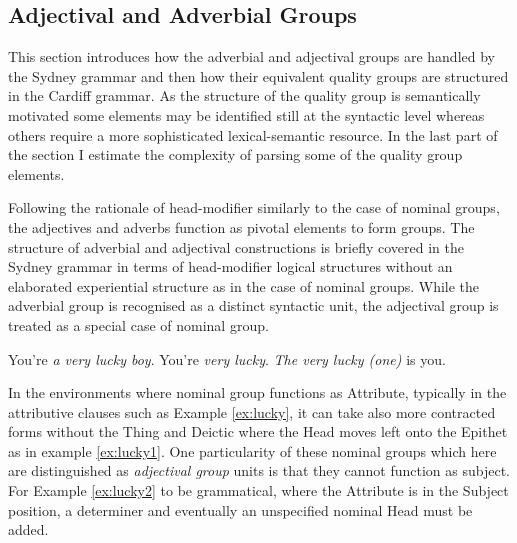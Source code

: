\subsection{Adjectival and Adverbial Groups}
	\label{sec:advectival-adverbial-groups}

    This section introduces how the adverbial and adjectival groups are handled by the Sydney grammar and then how their equivalent quality groups are structured in the Cardiff grammar. As the structure of the quality group is semantically motivated some elements may be identified still at the syntactic level whereas others require a more sophisticated lexical-semantic resource. In the last part of the section I estimate the complexity of parsing some of the quality group elements.

	Following the rationale of head-modifier similarly to the case of nominal groups, the adjectives and adverbs function as pivotal elements to form groups. The structure of adverbial and adjectival constructions is briefly covered in the Sydney grammar in terms of head-modifier logical structures without an elaborated experiential structure as in the case of nominal groups. While the adverbial group is recognised as a distinct syntactic unit, the adjectival group is treated as a special case of nominal group. %
	
	\begin{exe}
		\ex\label{ex:lucky} You're \textit{a very lucky boy}.
        \ex\label{ex:lucky1} You're \textit{very lucky}.
        \ex\label{ex:lucky2} \textit{The very lucky (one)} is you.
	\end{exe}
	
        

    In the environments where nominal group functions as Attribute, typically in the attributive clauses such as Example \ref{ex:lucky}, it can take also more contracted forms without the Thing and Deictic where the Head moves left onto the Epithet as in example \ref{ex:lucky1}. One particularity of these nominal groups which here are distinguished as \textit{adjectival group} units is that they cannot function as subject. For Example \ref{ex:lucky2} to be grammatical, where the Attribute is in the Subject position, a determiner and eventually an unspecified nominal Head must be added. 

